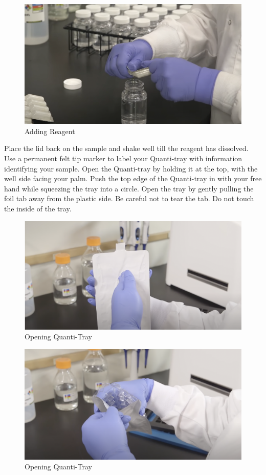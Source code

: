 \documentclass[12pt]{../SOP4_alpha}\usepackage[]{graphicx}\usepackage[]{xcolor}
\begin{document}
\begin{figure}[h!]
\includegraphics[scale=0.3]{AddingReagent.png}
\caption{Adding Reagent}
\label{fig:Adding Reagent}
\end{figure}

\NP Place the lid back on the sample and shake well till the reagent has dissolved.
\NP Use a permanent felt tip marker to label your Quanti-tray with information identifying your sample. 
\NP Open the Quanti-tray by holding it at the top, with the well side facing your palm. Push the top edge of the Quanti-tray in with your free hand while squeezing the tray into a circle. Open the tray by gently pulling the foil tab away from the plastic side. Be careful not to tear the tab. Do not touch the inside of the tray.
\begin{figure}[h!]
\includegraphics[scale=0.3]{OpeningQuanti-Tray.png}
\caption{Opening Quanti-Tray}
\label{fig:Opening Quanit-Tray}
\end{figure}

\begin{figure}[h!]
\includegraphics[scale=0.3]{OpeningQuanti-Tray2.png}
\caption{Opening Quanti-Tray}
\label{fig:Opening Quanti-Tray}
\end{figure}
\end{document}
